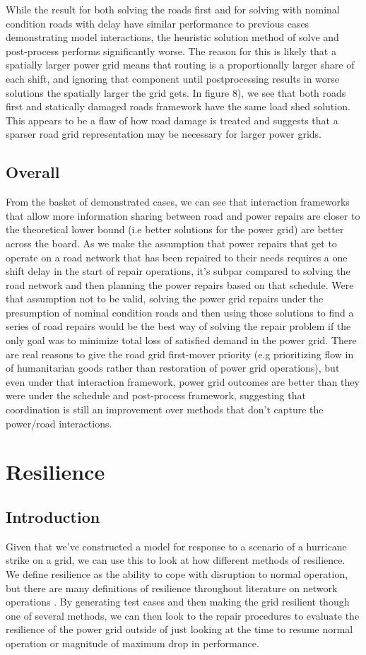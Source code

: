 \documentclass{article}
\begin{document}
	While the result for both solving the roads first and for solving with nominal condition roads with delay have similar performance to previous cases demonstrating model interactions, the heuristic solution method of solve and post-process performs significantly worse. The reason for this is likely that a spatially larger power grid means that routing is a proportionally larger share of each shift, and ignoring that component until postprocessing results in worse solutions the spatially larger the grid gets. In figure 8), we see that both roads first and statically damaged roads framework have the same load shed solution. This appears to be a flaw of how road damage is treated and suggests that a sparser road grid representation may be necessary for larger power grids.
	
	\subsection{Overall}
	From the basket of demonstrated cases, we can see that interaction frameworks that allow more information sharing between road and power repairs are closer to the theoretical lower bound (i.e better solutions for the power grid) are better across the board. As we make the assumption that power repairs that get to operate on a road network that has been repaired to their needs requires a one shift delay in the start of repair operations, it's subpar compared to solving the road network and then planning the power repairs based on that schedule. Were that assumption not to be valid, solving the power grid repairs under the presumption of nominal condition roads and then using those solutions to find a series of road repairs would be the best way of solving the repair problem if the only goal was to minimize total loss of satisfied demand in the power grid. There are real reasons to give the road grid first-mover priority (e.g prioritizing flow in of humanitarian goods rather than restoration of power grid operations), but even under that interaction framework, power grid outcomes are better than they were under the schedule and post-process framework, suggesting that coordination is still an improvement over methods that don't capture the power/road interactions.
	

	\section{Resilience}
	\subsection{Introduction}
	Given that we've constructed a model for response to a scenario of a hurricane strike on a grid, we can use this to look at how different methods of resilience. We define resilience as the ability to cope with disruption to normal operation, but there are many definitions of resilience throughout literature on network operations \cite{MolyneauxEA2016}. By generating test cases and then making the grid resilient though one of several methods, we can then look to the repair procedures to evaluate the resilience of the power grid outside of just looking at the time to resume normal operation or magnitude of maximum drop in performance.
	
\end{document}
